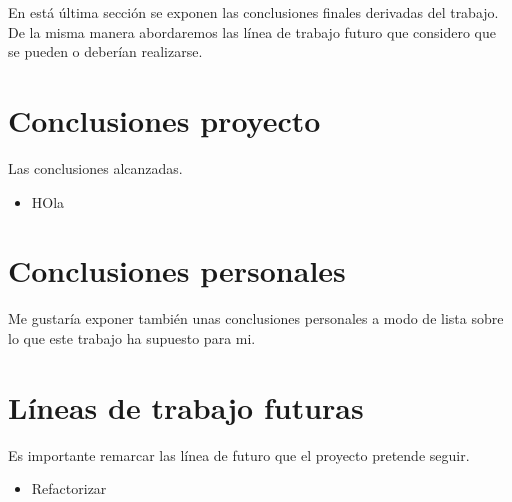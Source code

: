 
En está última sección se exponen las conclusiones finales derivadas del trabajo. De la misma manera abordaremos las línea de trabajo futuro que considero que se pueden o deberían realizarse.


\section{Conclusiones proyecto}\label{conclusiones_proyecto}
Las conclusiones alcanzadas.
\begin{itemize}
	\item HOla 
\end{itemize}

\section{Conclusiones personales}\label{conclusiones_personales}
Me gustaría exponer también unas conclusiones personales a modo de lista sobre lo que este trabajo ha supuesto para mi.  

\section{Líneas de trabajo futuras}\label{lineas_futuras}
Es importante remarcar las línea de futuro que el proyecto pretende seguir.

\begin{itemize}
	\item Refactorizar 
\end{itemize}